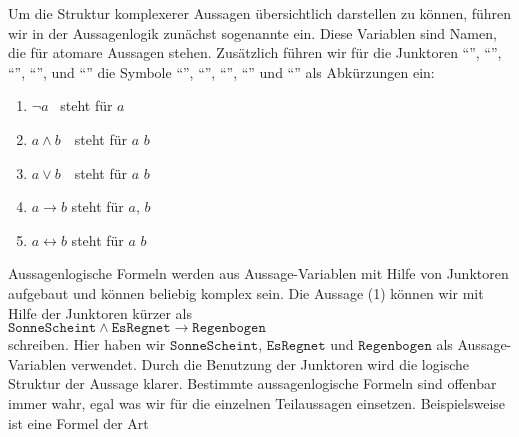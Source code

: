 Um die Struktur komplexerer Aussagen übersichtlich darstellen zu können, führen wir in der Aussagenlogik zunächst sogenannte
  ein.  Diese Variablen sind Namen, die für atomare Aussagen stehen.
Zusätzlich führen wir für die Junktoren 
``'', ``'', ``'', ``'', und 
``'' die Symbole ``\blue{$\neg$}'', ``\blue{$\wedge$}'', ``\blue{$\vee$}'',
``\blue{$\rightarrow$}'' und ``\blue{$\leftrightarrow$}'' als Abkürzungen ein: 
\begin{enumerate}
\item $\neg a$ \quad\quad\ steht für \quad {} $a$ 
      \vspace*{-0.2cm}

\item $a \wedge b$ \,\quad\ steht für \quad $a$  $b$
      \vspace*{-0.2cm}

\item $a \vee b$ \,\quad\ steht für \quad $a$  $b$
      \vspace*{-0.2cm}

\item $a \rightarrow b$   \quad steht für \quad {} $a$,  $b$
      \vspace*{-0.2cm}

\item $a \leftrightarrow b$  \quad steht für \quad  $a$  $b$
\end{enumerate}
Aussagenlogische Formeln werden aus Aussage-Variablen mit Hilfe von Junktoren aufgebaut
und können beliebig komplex sein.  Die Aussage (1) können wir mit Hilfe der Junktoren kürzer als
 \\[0.2cm]
\hspace*{1.3cm}
$\texttt{SonneScheint} \wedge \texttt{EsRegnet} \rightarrow \texttt{Regenbogen}$ 
\\[0.2cm]
schreiben.  Hier haben wir $\texttt{SonneScheint}$, $\texttt{EsRegnet}$ und $\texttt{Regenbogen}$
als Aussage-Variablen verwendet.  Durch die Benutzung der Junktoren wird die logische Struktur der Aussage
klarer. 
Bestimmte aussagenlogische Formeln sind offenbar immer wahr, egal was
 wir für die einzelnen Teilaussagen einsetzen.  Beispielsweise ist eine Formel der Art
\\[0.2cm]
